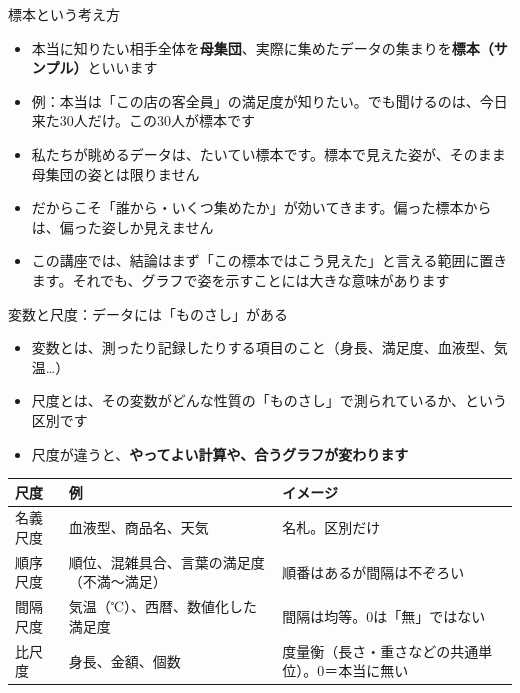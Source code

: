 \documentclass[aspectratio=169,11pt]{beamer}
\begin{document}
\begin{frame}{標本という考え方}
\begin{itemize}
\item 本当に知りたい相手全体を\textbf{母集団}、実際に集めたデータの集まりを\textbf{標本（サンプル）}といいます
\item 例：本当は「この店の客全員」の満足度が知りたい。でも聞けるのは、今日来た30人だけ。この30人が標本です
\item 私たちが眺めるデータは、たいてい標本です。標本で見えた姿が、そのまま母集団の姿とは限りません
\item だからこそ「誰から・いくつ集めたか」が効いてきます。偏った標本からは、偏った姿しか見えません
\item この講座では、結論はまず「この標本ではこう見えた」と言える範囲に置きます。それでも、グラフで姿を示すことには大きな意味があります
\end{itemize}
\end{frame}

\begin{frame}{変数と尺度：データには「ものさし」がある}
\begin{itemize}
\item 変数とは、測ったり記録したりする項目のこと（身長、満足度、血液型、気温…）
\item 尺度とは、その変数がどんな性質の「ものさし」で測られているか、という区別です
\item 尺度が違うと、\textbf{やってよい計算や、合うグラフが変わります}
\end{itemize}
\begin{center}
\begin{tabular}{lp{5.4cm}p{5.6cm}}
\toprule
尺度 & 例 & イメージ \\
\midrule
名義尺度 & 血液型、商品名、天気 & 名札。区別だけ \\
順序尺度 & 順位、混雑具合、言葉の満足度（不満〜満足） & 順番はあるが間隔は不ぞろい \\
間隔尺度 & 気温（℃）、西暦、数値化した満足度 & 間隔は均等。0は「無」ではない \\
比尺度 & 身長、金額、個数 & 度量衡（長さ・重さなどの共通単位）。0＝本当に無い \\
\bottomrule
\end{tabular}
\end{center}
\end{frame}
\end{document}
